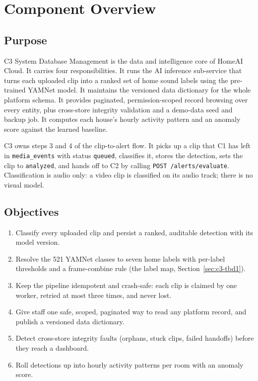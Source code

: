 \section{Component Overview}

\subsection{Purpose}
C3 System Database Management is the data and intelligence core of HomeAI Cloud. It carries four
responsibilities. It runs the AI inference sub-service that turns each uploaded clip into a ranked set of
home sound labels using the pre-trained YAMNet model. It maintains the versioned data dictionary for the whole
platform schema. It provides paginated, permission-scoped record browsing over every entity, plus cross-store
integrity validation and a demo-data seed and backup job. It computes each house's hourly activity pattern and
an anomaly score against the learned baseline.

C3 owns steps 3 and 4 of the clip-to-alert flow. It picks up a clip that C1 has left in \texttt{media\_events}
with status \texttt{queued}, classifies it, stores the detection, sets the clip to \texttt{analyzed}, and hands off
to C2 by calling \texttt{POST /alerts/evaluate}. Classification is audio only: a video clip is classified on its
audio track; there is no visual model.

\subsection{Objectives}
\begin{enumerate}
\item Classify every uploaded clip and persist a ranked, auditable detection with its model version.
\item Resolve the 521 YAMNet classes to seven home labels with per-label thresholds and a frame-combine rule (the label map, Section~\ref{sec:c3-tbd1}).
\item Keep the pipeline idempotent and crash-safe: each clip is claimed by one worker, retried at most three times, and never lost.
\item Give staff one safe, scoped, paginated way to read any platform record, and publish a versioned data dictionary.
\item Detect cross-store integrity faults (orphans, stuck clips, failed handoffs) before they reach a dashboard.
\item Roll detections up into hourly activity patterns per room with an anomaly score.
\end{enumerate}

